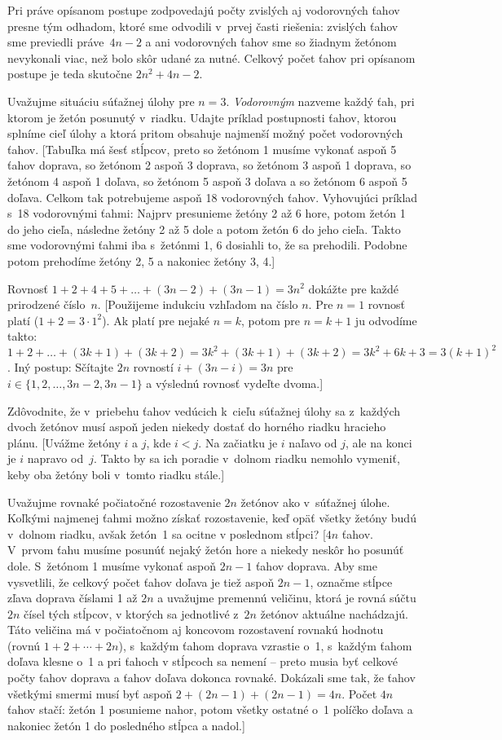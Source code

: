 {Pri práve opísanom postupe zodpovedajú počty zvislých aj
vodorovných ťahov presne tým odhadom, ktoré sme odvodili v~prvej
časti riešenia: zvislých ťahov sme previedli práve~$4n-2$ a
ani vodorovných ťahov sme so žiadnym žetónom nevykonali viac,
než bolo skôr udané za nutné.
Celkový počet ťahov pri opísanom postupe je teda skutočne $2n^2+4n-2$.


Uvažujme situáciu súťažnej úlohy pre $n=3$. {\it Vodorovným
\/} nazveme každý ťah, pri ktorom je žetón posunutý v~riadku.
Udajte príklad postupnosti ťahov, ktorou splníme cieľ úlohy
a ktorá pritom obsahuje najmenší možný počet vodorovných ťahov.
[Tabuľka má šesť stĺpcov, preto so žetónom 1 musíme vykonať
aspoň 5 ťahov doprava, so žetónom 2 aspoň 3 doprava,
so žetónom 3 aspoň 1 doprava, so žetónom 4 aspoň 1 doľava,
so žetónom 5 aspoň 3 doľava a so žetónom 6 aspoň 5 doľava. Celkom tak
potrebujeme aspoň 18 vodorovných ťahov. Vyhovujúci príklad
s~18 vodorovnými ťahmi: Najprv presunieme žetóny 2 až 6 hore,
potom žetón 1 do jeho cieľa, následne žetóny 2 až 5 dole a potom
žetón 6 do jeho cieľa. Takto sme vodorovnými ťahmi
iba s~žetónmi 1, 6 dosiahli to, že sa prehodili.
Podobne potom prehodíme žetóny 2, 5 a nakoniec žetóny 3, 4.]

Rovnosť $1+2+4+5+\dots+(3n-2)+(3n-1)=3n^2$ dokážte pre každé
prirodzené číslo~$n$.
[Použijeme indukciu vzhľadom na číslo $n$. Pre $n=1$ rovnosť platí
($1+2=3\cdot1^2$). Ak platí pre nejaké $n=k$, potom pre $n=k+1$
ju odvodíme takto: $1+2+\dots+(3k+1)+(3k+2)=3k^2+(3k+1)+(3k+2)=
3k^2+6k+3=3(k+1)^2$. Iný postup: Sčítajte $2n$ rovností
$i+(3n-i)=3n$ pre $i\in\{1,2,\dots,3n-2,3n-1\}$ a
výslednú rovnosť vydeľte dvoma.]

Zdôvodnite, že v~priebehu ťahov vedúcich k~cieľu súťažnej úlohy sa
z~každých dvoch žetónov musí aspoň jeden niekedy dostať do horného
riadku hracieho plánu.
[Uvážme žetóny $i$ a $j$, kde $i<j$. Na začiatku je $i$
naľavo od $j$, ale na konci je $i$ napravo od~$j$.
Takto by sa ich poradie v~dolnom riadku nemohlo vymeniť, keby oba
žetóny boli v~tomto riadku stále.]

\D
Uvažujme rovnaké počiatočné rozostavenie $2n$ žetónov
ako v~súťažnej úlohe. Koľkými najmenej ťahmi možno získať
rozostavenie, keď opäť všetky žetóny budú v~dolnom riadku,
avšak žetón~1 sa ocitne v poslednom stĺpci?
[$4n$ ťahov. V~prvom ťahu musíme posunúť nejaký žetón hore a niekedy
neskôr ho posunúť dole. S~žetónom 1 musíme vykonať aspoň
$2n-1$ ťahov doprava. Aby sme vysvetlili, že celkový počet ťahov
doľava je tiež aspoň $2n-1$, označme stĺpce zľava doprava
číslami 1 až $2n$ a uvažujme premennú veličinu, ktorá je rovná
súčtu $2n$ čísel tých stĺpcov, v ktorých sa jednotlivé z~$2n$ žetónov
aktuálne nachádzajú. Táto veličina má v počiatočnom aj koncovom
rozostavení rovnakú hodnotu (rovnú $1+2+\cdots+2n$),
s~každým ťahom doprava vzrastie o~1, s~každým ťahom doľava klesne o~1
a pri ťahoch v stĺpcoch sa nemení --
preto musia byť celkové počty ťahov doprava a ťahov doľava
dokonca rovnaké. Dokázali sme tak, že ťahov všetkými smermi musí
byť aspoň $2+(2n-1)+(2n-1)=4n$. Počet $4n$ ťahov stačí:
žetón 1 posunieme nahor, potom všetky ostatné o~1 políčko doľava
a nakoniec žetón 1 do posledného stĺpca a nadol.]


}
